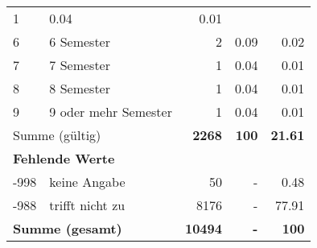 \begin{longtable}{lXrrr}
       \num{1} &
       \num[round-mode=places,round-precision=2]{0,04} &
         \num[round-mode=places,round-precision=2]{0,01} \\

     6 &
     \multicolumn{1}{X}{ 6 Semester   } &


       \num{2} &
       \num[round-mode=places,round-precision=2]{0,09} &
         \num[round-mode=places,round-precision=2]{0,02} \\

     7 &
     \multicolumn{1}{X}{ 7 Semester   } &


       \num{1} &
       \num[round-mode=places,round-precision=2]{0,04} &
         \num[round-mode=places,round-precision=2]{0,01} \\

     8 &
     \multicolumn{1}{X}{ 8 Semester   } &


       \num{1} &
       \num[round-mode=places,round-precision=2]{0,04} &
         \num[round-mode=places,round-precision=2]{0,01} \\

     9 &
     \multicolumn{1}{X}{ 9 oder mehr Semester   } &


       \num{1} &
       \num[round-mode=places,round-precision=2]{0,04} &
         \num[round-mode=places,round-precision=2]{0,01} \\
     \midrule
     \multicolumn{2}{l}{Summe (gültig)} &
       \textbf{\num{2268}} &
     \textbf{100} &
       \textbf{\num[round-mode=places,round-precision=2]{21,61}} \\
     \multicolumn{5}{l}{\textbf{Fehlende Werte}}\\
       -998 &
       keine Angabe &
         \num{50} &
        - &
         \num[round-mode=places,round-precision=2]{0,48} \\
       -988 &
       trifft nicht zu &
         \num{8176} &
        - &
         \num[round-mode=places,round-precision=2]{77,91} \\
     \midrule
     \multicolumn{2}{l}{\textbf{Summe (gesamt)}} &
          \textbf{\num{10494}} &
        \textbf{-} &
        \textbf{100} \\
     \bottomrule
     \end{longtable}
     
